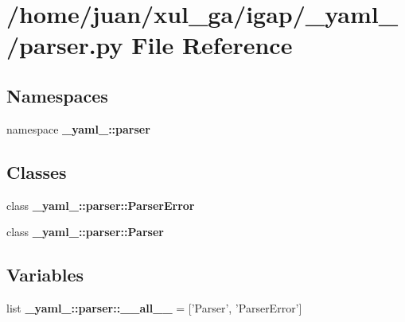 \section{/home/juan/xul\_\-ga/igap/\_\-yaml\_\-/parser.py File Reference}
\label{parser_8py}
\subsection*{Namespaces}
\begin{CompactItemize}
\item 
namespace {\bf \_\-yaml\_\-::parser}
\end{CompactItemize}
\subsection*{Classes}
\begin{CompactItemize}
\item 
class {\bf \_\-yaml\_\-::parser::ParserError}
\item 
class {\bf \_\-yaml\_\-::parser::Parser}
\end{CompactItemize}
\subsection*{Variables}
\begin{CompactItemize}
\item 
list {\bf \_\-yaml\_\-::parser::\_\-\_\-all\_\-\_\-} = ['Parser', 'ParserError']
\end{CompactItemize}
